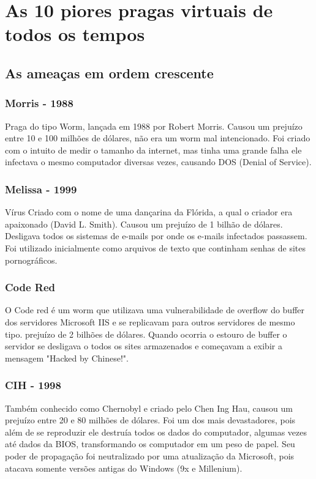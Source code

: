 \chapter{As 10 piores pragas virtuais de todos os tempos}
\section {As ameaças em ordem crescente}
\subsection{Morris - 1988}

	Praga do tipo Worm, lançada em 1988 por Robert Morris. Causou um prejuízo entre 10 e 100 milhões de dólares, não era um worm mal intencionado. Foi criado com o intuito de medir o tamanho da internet, mas tinha uma grande falha ele infectava o mesmo computador diversas vezes, causando DOS (Denial of Service).

\subsection{Melissa - 1999}
	Vírus Criado com o nome de uma dançarina da Flórida, a qual o criador era apaixonado (David L. Smith). Causou um prejuízo de 1 bilhão de dólares. Desligava todos os sistemas de e-mails por onde os e-mails infectados passassem. Foi utilizado inicialmente como arquivos de texto que continham senhas de sites pornográficos.

\subsection{Code Red}

	O Code red é um worm que utilizava uma vulnerabilidade de overflow do buffer dos servidores Microsoft IIS e se replicavam para outros servidores de mesmo tipo. prejuízo de 2 bilhões de dólares. Quando ocorria o estouro de buffer o servidor se desligava o todos os sites armazenados e começavam a exibir a mensagem "Hacked by Chinese!".

\subsection{CIH - 1998}

	Também conhecido como Chernobyl e criado pelo Chen Ing Hau, causou um prejuízo entre 20 e 80 milhões de dólares. Foi um dos mais devastadores, pois além de se reproduzir ele destruía todos os dados do computador, algumas vezes até dados da BIOS, transformando os computador em um peso de papel. Seu poder de propagação foi neutralizado por uma atualização da Microsoft, pois atacava somente versões antigas do Windows (9x e Millenium).

